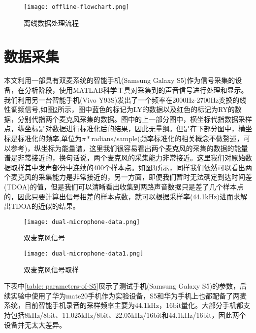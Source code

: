 \documentclass[winfonts,oneside]{njuthesis}
\begin{document}
		\begin{figure}[H]
			\centering
			\caption{离线数据处理流程}
			\texttt{[image: offline-flowchart.png]} 
			\label{fig: offline-flowchart}
		\end{figure}
	
	\section{数据采集}
	
		本文利用一部具有双麦系统的智能手机(Samsung Galaxy S5)作为信号采集的设备，在分析阶段，使用MATLAB科学工具对采集到的声音信号进行处理和显示。我们利用另一台智能手机(Vivo Y93S)发出了一个频率在2000Hz-2700Hz变换的线性调频信号,如图\ref{fig: dual-microphone-data}所示，图中蓝色的标记为LY的数据以及红色的标记为RY的数据，分别代指两个麦克风采集的数据。图中的上一部分图中，横坐标代指数据采样点，纵坐标是对数据进行标准化后的结果，因此无量纲。但是在下部分图中，横坐标是标准化的频率,单位为$\pi * $radians/sample(频率标准化的相关概念不做赘述，可以参考\cite{Normalized_frequency})，纵坐标为能量谱，这里我们很容易看出两个麦克风的采集的数据的能量谱是非常接近的，换句话说，两个麦克风的采集能力非常接近。这里我们对原始数据取样其中发声部分中连续的400个样本点。如图\ref{fig: dual-microphone-data1}所示，同样我们依然可以看出两个麦克风的采集能力是非常接近的，另一方面，即便我们暂时无法确定到达时间差(TDOA)的值，但是我们可以清晰看出收集到两路声音数据只是差了几个样本点的，因此只要计算出信号相差的样本点数，就可以根据采样率(44.1kHz)进而求解出TDOA的近似的结果。
		
		\begin{figure}[H]
			\centering
			\texttt{[image: dual-microphone-data.png]} 
			\caption{双麦克风信号}
			\label{fig: dual-microphone-data}
		\end{figure}
	
		\begin{figure}[H]
			\centering
			\texttt{[image: dual-microphone-data1.png]} 
			\caption{双麦克风信号取样}
			\label{fig: dual-microphone-data1}
		\end{figure}
		
		下表中\ref{table: parameters-of-S5}展示了测试手机(Samsung Galaxy S5)的参数，后续实验中使用了华为mate20手机作为实验设备，S5和华为手机上也都配备了两麦系统，目前智能手机录音的采样频率主要为44.1kHz，16bit量化。大部分手机都支持包括8kHz/8bit、11.025kHz/8bit、22.05kHz/16bit和44.1kHz/16bit，因此两个设备并无太大差异。
		
\end{document}
